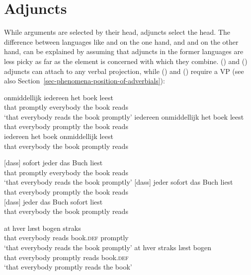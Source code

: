 \fi


\section{Adjuncts}
\label{sec-adjuncts}

While arguments are selected by their head, adjuncts select the head. The difference between
languages like  and  on the one hand, and  and  on the other hand, can be
explained by assuming that adjuncts in the former languages are less picky as far as the element is
concerned with which they combine.  () and  ()
adjuncts can attach to any verbal projection, while  () and  () require a
VP (see also Section~\ref{sec-phenomena-position-of-adverbials}):

\eal
\ex 
\gll [dat] onmiddellijk iedereen het boek leest\\
     \spacebr{}that promptly everybody the book reads\\\dutch
\glt `that everybody reads the book promptly'
\ex
\gll [dat] iedereen onmiddellijk het boek leest\\ 
     \spacebr{}that everybody promptly the book reads\\ 
\ex
\gll [dat] iedereen het boek onmiddellijk leest\\ 
    \spacebr{}that everybody the book promptly reads\\
\zl

\eal
\ex
\label{ex-m-j-b-l} 
\gll {}[dass] sofort jeder das Buch liest\\
     \spacebr{}that promptly everybody the book reads\\\german
\glt `that everybody reads the book promptly'
\ex
\label{ex-j-m-b-l} 
\gll {}[dass] jeder sofort das Buch liest\\
     \spacebr{}that everybody promptly the book reads\\ 
\ex
\label{ex-j-b-m-l}
\gll {}[dass] jeder das Buch sofort liest\\
    \spacebr{}that everybody the book promptly reads\\
\zl


\eal
\ex 
\gll at hver læst bogen straks\\
     that everybody reads book.\textsc{def} promptly\\ \danish
\glt `that everybody reads the book promptly'
\ex 
\gll at hver straks læst bogen\\
     that everybody promptly reads book.\textsc{def}\\
\glt `that everybody promptly reads the book'
\zl

